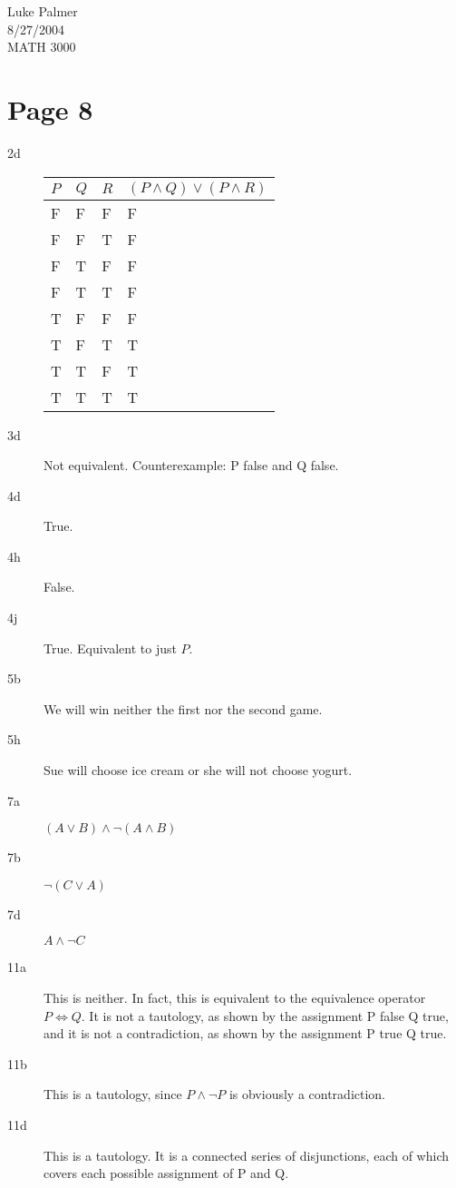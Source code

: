 \documentclass[12pt]{article}
\begin{document}
\noindent Luke Palmer \\
8/27/2004 \\
MATH 3000

\section*{Page 8}
\begin{description}
\item[2d] 
  \begin{tabular}{lll|l}
    $P$ & $Q$ & $R$ & $(P \wedge Q) \vee (P \wedge R)$ \\
    \hline
     F  &  F  &  F  &  F \\
     F  &  F  &  T  &  F \\
     F  &  T  &  F  &  F \\
     F  &  T  &  T  &  F \\
     T  &  F  &  F  &  F \\
     T  &  F  &  T  &  T \\
     T  &  T  &  F  &  T \\
     T  &  T  &  T  &  T
  \end{tabular}

\item[3d] Not equivalent.  Counterexample: P false and Q false.

\item[4d] True.

\item[4h] False.

\item[4j] True.  Equivalent to just $P$.

\item[5b] We will win neither the first nor the second game.

\item[5h] Sue will choose ice cream or she will not choose yogurt.

\item[7a] $(A \vee B) \wedge \neg (A \wedge B)$  

\item[7b] $\neg (C \vee A)$

\item[7d] $A \wedge \neg C$

\item[11a] This is neither.  In fact, this is equivalent to the equivalence
operator $P \Leftrightarrow Q$.  It is not a tautology, as shown by the
assignment P false Q true, and it is not a contradiction, as shown by the
assignment P true Q true.

\item[11b] This is a tautology, since $P \wedge \neg P$ is obviously a
contradiction.

\item[11d] This is a tautology.  It is a connected series of disjunctions, each
of which covers each possible assignment of P and Q.
\end{description}
\end{document}
